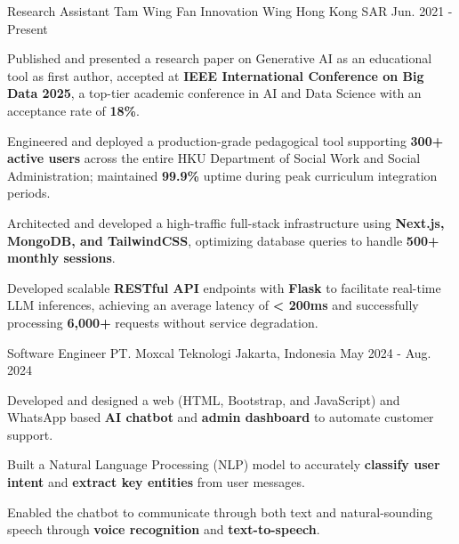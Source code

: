 

\begin{cventries}

  \cventry
    {Research Assistant} %
    {Tam Wing Fan Innovation Wing} %
    {Hong Kong SAR} %
    {Jun. 2021 - Present} %
    {
      \begin{cvitems} %
        \item {Published and presented a research paper on Generative AI as an educational tool as first author, accepted at \textbf{IEEE International Conference on Big Data 2025}, a top-tier academic conference in AI and Data Science with an acceptance
rate of \textbf{18\%}.}
        \item {Engineered and deployed a production-grade pedagogical tool supporting \textbf{300+ active users} across the entire HKU Department of Social Work and Social Administration; maintained \textbf{99.9\%} uptime during peak curriculum integration periods.}
        \item {Architected and developed a high-traﬀic full-stack infrastructure using \textbf{Next.js, MongoDB, and TailwindCSS}, optimizing database queries to handle \textbf{500+ monthly sessions}.}
        \item {Developed scalable \textbf{RESTful API} endpoints with \textbf{Flask} to facilitate real-time LLM inferences, achieving an average latency of \textbf{< 200ms} and successfully processing \textbf{6,000+} requests without service degradation.}
      \end{cvitems}
    }


  \cventry
    {Software Engineer} %
    {PT. Moxcal Teknologi} %
    {Jakarta, Indonesia} %
    {May 2024 - Aug. 2024} %
    {
      \begin{cvitems} %
        \item {Developed and designed a web (HTML, Bootstrap, and JavaScript) and WhatsApp based \textbf{AI chatbot} and \textbf{admin dashboard} to automate customer support.}
        \item {Built a Natural Language Processing (NLP) model to accurately \textbf{classify user intent} and \textbf{extract key entities} from user messages.}
        \item {Enabled the chatbot to communicate through both text and natural-sounding speech through \textbf{voice recognition} and \textbf{text-to-speech}.}
      \end{cvitems}
    }
\end{cventries}
